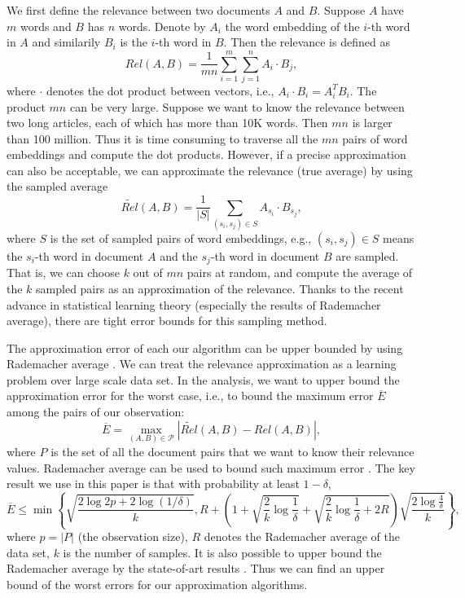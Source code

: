 \documentclass{article}
\begin{document}
We first define the relevance between two documents $A$ and $B$. Suppose $A$ have $m$ words and $B$ has $n$ words. Denote by $A_i$ the word embedding of the $i$-th word in $A$ and similarily $B_i$ is the $i$-th word in $B$. Then the relevance is defined as
$$Rel(A,B) = \frac{1}{mn} \sum_{i=1}^m \sum_{j=1}^n A_i\cdot B_j,$$
where $\cdot$ denotes the dot product between vectors, i.e., $A_i\cdot B_i = A_i^T B_i$. 
The product $mn$ can be very large. Suppose we want to know the relevance between two long articles, each of which has more than 10K words. Then $mn$ is larger than 100 million. Thus it is time consuming to traverse all the $mn$ pairs of word embeddings and compute the dot products. However, if a precise approximation can also be acceptable, we can approximate the relevance (true average) by using the sampled average
$$\widetilde{Rel}(A,B) = \frac{1}{|S|} \sum_{(s_i, s_j)\in S} A_{s_i}\cdot B_{s_j},$$
where $S$ is the set of sampled pairs of word embeddings, e.g., $(s_i, s_j) \in S$ means the $s_i$-th word in document $A$ and the $s_j$-th word in document $B$ are sampled. 
That is, we can choose $k$ out of $mn$ pairs at random, and compute the average of the $k$ sampled pairs as an approximation of the relevance.
Thanks to the recent advance in statistical learning theory (especially the results of Rademacher average), there are tight error bounds for this sampling method.

The approximation error of each our algorithm can be upper bounded by using Rademacher average \cite{BM02,Mohri09,BBM05}. We can treat the relevance approximation as a learning problem over large scale data set. In the analysis, we want to upper bound the approximation error for the worst case, i.e., to bound the maximum error $\overline{E}$ among the pairs of our observation:
$$\overline{E} = \max_{(A,B)\in \mathcal{P}} |\widetilde{Rel}(A,B) - Rel(A,B)|,$$
where $P$ is the set of all the document pairs that we want to know their relevance values. 
Rademacher average can be used to bound such maximum error \cite{RU15,RU16}. The key result we use in this paper is that with probability at least $1-\delta$,
$$\overline{E} \leq \min\left\{\sqrt{\frac{2\log 2p + 2\log(1/\delta)}{k}}, R + \left(1+\sqrt{\frac{2}{k}\log \frac{1}{\delta}} + \sqrt{\frac{2}{k}\log \frac{1}{\delta} + 2R}\right)\sqrt{\frac{2\log \frac{4}{\delta}}{k}}\right\},$$
where $p=|P|$ (the observation size), $R$ denotes the Rademacher average of the data set, $k$ is the number of samples. 
It is also possible to upper bound the Rademacher average by the state-of-art results \cite{AGO14,RU15,RU16}. Thus we can find an upper bound of the worst errors for our approximation algorithms.
\end{document}
